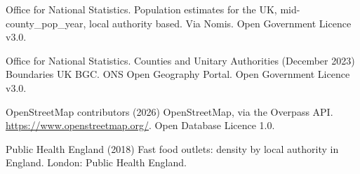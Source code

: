 \documentclass[11pt,a4paper]{article}
\begin{document}
Office for National Statistics. Population estimates for the UK, mid-{{county_pop_year}}, local authority based. Via Nomis. Open Government Licence v3.0.

Office for National Statistics. Counties and Unitary Authorities (December 2023) Boundaries UK BGC. ONS Open Geography Portal. Open Government Licence v3.0.

OpenStreetMap contributors (2026) OpenStreetMap, via the Overpass API. \url{https://www.openstreetmap.org/}. Open Database Licence 1.0.

Public Health England (2018) Fast food outlets: density by local authority in England. London: Public Health England.

\endgroup
\end{document}
